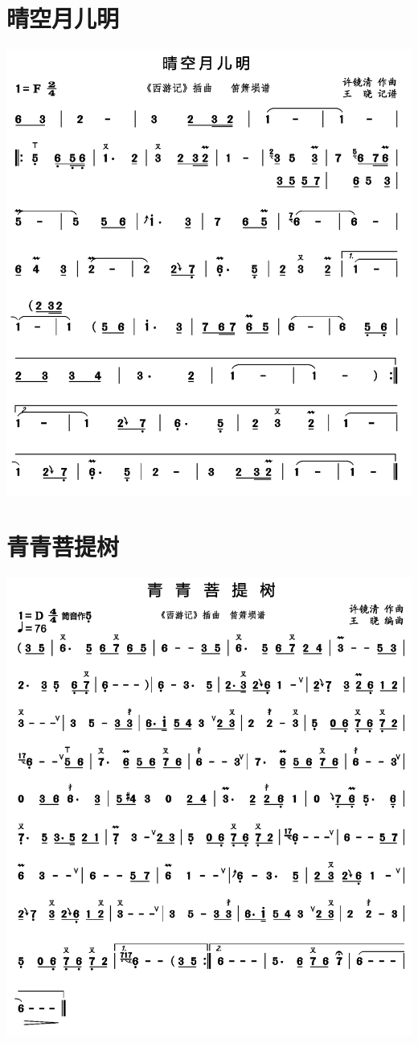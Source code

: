 \documentclass[cn,pad,twocol]{elegantbook}
\begin{document}
\section{晴空月儿明} \includegraphics[width=\textwidth]{rpi400/20210206西游记晴空月儿明.png}
\section{青青菩提树} \includegraphics[width=\textwidth]{rpi400/20210206西游记青青菩提树.png}
\end{document}
